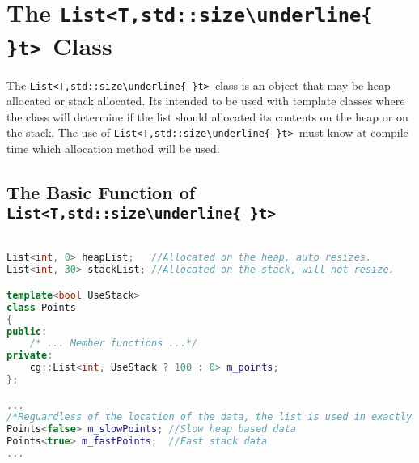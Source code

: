 \documentclass{article}
\newlength\tdima \newlength\tdimb \setlength\tdima{ \fboxsep+\fboxrule} \setlength\tdimb{-\fboxsep+\fboxrule}
\newcommand{\theobj}{\protect\Verb+List<T,std::size\underline{ }t> +}
\begin{document}
\tableofcontents




\captionsetup[lstlisting]{format=listing,labelfont=white,textfont=white}
\lstset{style=cppstyle}

\section{The \theobj Class}

The \theobj class is an object that may be heap allocated or stack allocated.  Its intended to be used with template classes where the class will determine if the list should allocated its contents on the heap or on the stack.  The use of \theobj must know at compile time which allocation method will be used.

\subsection{The Basic Function of \theobj}


\begin{lstlisting}[language=C++, label=code:1, caption=Demoting types]

List<int, 0> heapList;   //Allocated on the heap, auto resizes.
List<int, 30> stackList; //Allocated on the stack, will not resize.

template<bool UseStack>
class Points
{
public:
	/* ... Member functions ...*/
private:
	cg::List<int, UseStack ? 100 : 0> m_points;
};

...
/*Reguardless of the location of the data, the list is used in exactly the same way, with exactly the same code.*/
Points<false> m_slowPoints; //Slow heap based data
Points<true> m_fastPoints;  //Fast stack data
...

\end{lstlisting}
\end{document}
